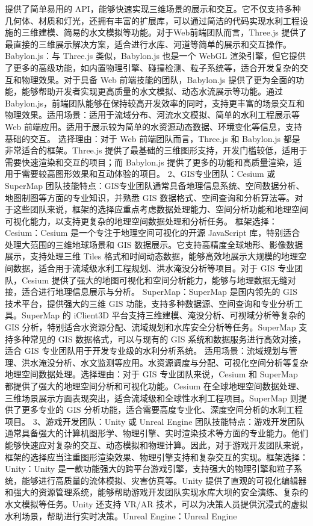 提供了简单易用的 API，能够快速实现三维场景的展示和交互。它不仅支持多种几何体、材质和灯光，还拥有丰富的扩展库，可以通过简洁的代码实现水利工程设施的三维建模、简易的水文模拟等功能。对于Web前端团队而言，Three.js 提供了最直接的三维展示解决方案，适合进行水库、河道等简单的展示和交互操作。 Babylon.js：与 Three.js 类似，Babylon.js 也是一个 WebGL 渲染引擎，但它提供了更多的高级功能，如内置物理引擎、碰撞检测、粒子系统等，适合开发复杂的交互和物理效果。对于具备 Web 前端技能的团队，Babylon.js 提供了更为全面的功能，能够帮助开发者实现更高质量的水文模拟、动态水流展示等功能。通过 Babylon.js，前端团队能够在保持较高开发效率的同时，支持更丰富的场景交互和物理效果。适用场景：适用于流域分布、河流水文模拟、简单的水利工程展示等 Web 前端应用。适用于展示较为简单的水资源动态数据、环境变化等信息，支持基础的交互。 选择理由：对于 Web 前端团队而言，Three.js 和 Babylon.js 都是非常适合的框架。Three.js 提供了最基础的三维图形支持，开发门槛较低，适用于需要快速渲染和交互的项目；而 Babylon.js 提供了更多的功能和高质量渲染，适用于需要较高图形效果和互动体验的项目。 2、GIS专业团队：Cesium 或 SuperMap 团队技能特点：GIS专业团队通常具备地理信息系统、空间数据分析、地图制图等方面的专业知识，并熟悉 GIS 数据格式、空间查询和分析算法等。对于这些团队来说，框架的选择应重点考虑数据处理能力、空间分析功能和地理空间可视化能力，以支持更复杂的地理空间数据处理和分析任务。 框架选择：Cesium：Cesium 是一个专注于地理空间可视化的开源 JavaScript 库，特别适合处理大范围的三维地球场景和 GIS 数据展示。它支持高精度全球地形、影像数据展示，支持处理三维 Tiles 格式和时间动态数据，能够高效地展示大规模的地理空间数据，适合用于流域级水利工程规划、洪水淹没分析等项目。对于 GIS 专业团队，Cesium 提供了强大的地图可视化和空间分析能力，能够与地理数据无缝对接，适合进行地理信息展示与分析。 SuperMap：SuperMap 是国内领先的 GIS 技术平台，提供强大的三维 GIS 功能，支持多种数据源、空间查询和专业分析工具。SuperMap 的 iClient3D 平台支持三维建模、淹没分析、可视域分析等复杂的 GIS 分析，特别适合水资源分配、流域规划和水库安全分析等任务。SuperMap 支持多种常见的 GIS 数据格式，可以与现有的 GIS 系统和数据服务进行高效对接，适合 GIS 专业团队用于开发专业级的水利分析系统。 适用场景：流域规划与管理、洪水淹没分析、水文监测等应用。水资源调度与分配、可视化空间分析等复杂地理空间数据处理。选择理由：对于 GIS 专业团队来说，Cesium 和 SuperMap 都提供了强大的地理空间分析和可视化功能。Cesium 在全球地理空间数据处理、三维场景展示方面表现突出，适合流域级和全球性水利工程项目。SuperMap 则提供了更多专业的 GIS 分析功能，适合需要高度专业化、深度空间分析的水利工程项目。 3、游戏开发团队：Unity 或 Unreal Engine 团队技能特点：游戏开发团队通常具备强大的计算机图形学、物理引擎、实时渲染技术等方面的专业能力。他们能够快速应对复杂的交互、动态模拟和物理计算。因此，对于游戏开发团队来说，框架的选择应当注重图形渲染效果、物理引擎支持和复杂交互的实现。框架选择：Unity：Unity 是一款功能强大的跨平台游戏引擎，支持强大的物理引擎和粒子系统，能够进行高质量的流体模拟、灾害仿真等。Unity 提供了直观的可视化编辑器和强大的资源管理系统，能够帮助游戏开发团队实现水库大坝的安全演练、复杂的水文模拟等任务。Unity 还支持 VR/AR 技术，可以为决策人员提供沉浸式的虚拟水利场景，帮助进行实时决策。Unreal Engine：Unreal Engine 